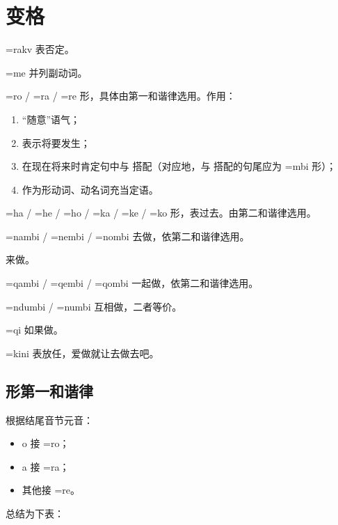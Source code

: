 \pagebreak

\section{变格}

\begin{des}
    \item[\V =rakv ] 表否定。
    \item[\V =me] 并列副动词。
    \item[\V =ro / \V =ra / \V =re]  形，具体由第一和谐律选用。作用：
        \begin{enumerate}
            \item “随意”语气；
            \item 表示将要发生；
            \item 在现在将来时肯定句中与  搭配（对应地，与  搭配的句尾应为 =mbi 形）；
            \item 作为形动词、动名词充当定语。
        \end{enumerate}
    \item[\V =ha / \V =he / \V =ho / \V =ka / \V =ke / \V =ko] 形，表过去。由第二和谐律选用。
    \item[\V =nambi / \V =nembi / \V =nombi] 去做\V  ，依第二和谐律选用。
    \item[\V \bil{='jimbi}{\lat{-njimbi}}] 来做\V 。
    \item[\V =qambi / \V =qembi / \V =qombi] 一起做，依第二和谐律选用。
    \item[\V =ndumbi / \V =numbi] 互相做\V ，二者等价。
    \item[\V =qi] 如果做\V。
    \item[\V =kini] 表放任，爱做\V 就让去做去吧。 
\end{des}

\subsection{形第一和谐律}

根据\V 结尾音节元音：

\begin{itemize}
    \item o 接 =ro；
    \item a 接 =ra；
    \item 其他接 =re。
\end{itemize}

总结为下表：

